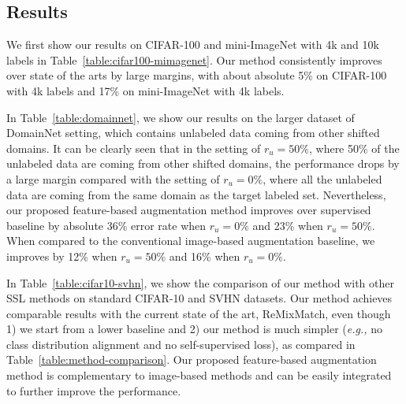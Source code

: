 \documentclass[runningheads]{llncs}
\begin{document}
\subsection{Results}\label{section:results}

We first show our results on CIFAR-100 and mini-ImageNet with 4k and 10k labels in Table~\ref{table:cifar100-mimagenet}.
Our method consistently improves over state of the arts by large margins, with about absolute 5\% on CIFAR-100 with 4k labels and 17\% on mini-ImageNet with 4k labels.

In Table~\ref{table:domainnet}, we show our results on the larger dataset of DomainNet setting, which contains unlabeled data coming from other shifted domains.
It can be clearly seen that in the setting of $r_u = 50\%$, where 50\% of the unlabeled data are coming from other shifted domains, the performance drops by a large margin compared with the setting of $r_u = 0\%$, where all the unlabeled data are coming from the same domain as the target labeled set.
Nevertheless, our proposed feature-based augmentation method improves over supervised baseline by absolute 36\% error rate when $r_u = 0\%$ and 23\% when $r_u = 50\%$.
When compared to the conventional image-based augmentation baseline, we improves by 12\% when $r_u = 50\%$ and 16\% when $r_u = 0\%$.

In Table~\ref{table:cifar10-svhn}, we show the comparison of our method with other SSL methods on standard CIFAR-10 and SVHN datasets.
Our method achieves comparable results with the current state of the art, ReMixMatch, even though 1) we start from a lower baseline and 2) our method is much simpler (\textit{e.g.,} no class distribution alignment and no self-supervised loss), as compared in Table~\ref{table:method-comparison}.
Our proposed feature-based augmentation method is complementary to image-based methods and can be easily integrated to further improve the performance.
\end{document}
